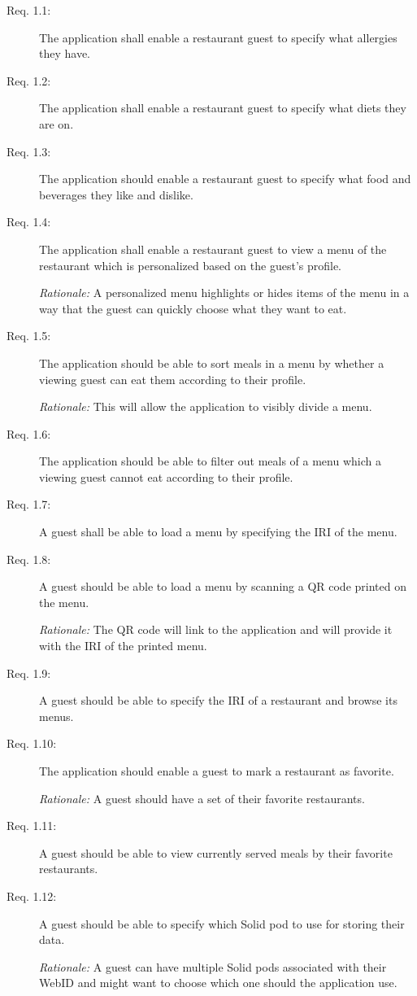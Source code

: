 \begin{description}
    \item [Req. 1.1:] The application shall enable a restaurant guest to specify what allergies they have.
    \item [Req. 1.2:] The application shall enable a restaurant guest to specify what diets they are on.
    \item [Req. 1.3:] The application should enable a restaurant guest to specify what food and beverages they like and dislike.
    \item [Req. 1.4:] The application shall enable a restaurant guest to view a menu of the restaurant which is personalized based on the guest's profile.

    \emph{Rationale:} A personalized menu highlights or hides items of the menu in a way that the guest can quickly choose what they want to eat. 
    \item [Req. 1.5:] The application should be able to sort meals in a menu by whether a viewing guest can eat them according to their profile.

    \emph{Rationale:} This will allow the application to visibly divide a menu.
    \item [Req. 1.6:] The application should be able to filter out meals of a menu which a viewing guest cannot eat according to their profile.
    \item [Req. 1.7:] A guest shall be able to load a menu by specifying the IRI of the menu.
    \item [Req. 1.8:] A guest should be able to load a menu by scanning a QR code printed on the menu.

    \emph{Rationale:} The QR code will link to the application and will provide it with the IRI of the printed menu.
    \item [Req. 1.9:] A guest should be able to specify the IRI of a restaurant and browse its menus.
    \item [Req. 1.10:] The application should enable a guest to mark a restaurant as favorite.
    
    \emph{Rationale:} A guest should have a set of their favorite restaurants.
    \item [Req. 1.11:] A guest should be able to view currently served meals by their favorite restaurants.
    \item [Req. 1.12:] A guest should be able to specify which Solid pod to use for storing their data.

    \emph{Rationale:} A guest can have multiple Solid pods associated with their WebID and might want to choose which one should the application use.
\end{description}

